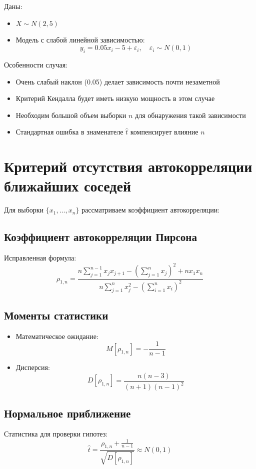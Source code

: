 \documentclass{article}
\begin{document}
Даны:
\begin{itemize}
    \item $X \sim N(2, 5)$
    \item Модель с слабой линейной зависимостью:
    \[ y_i = 0.05x_i - 5 + \varepsilon_i, \quad \varepsilon_i \sim N(0, 1)
    \]
\end{itemize}

Особенности случая:
\begin{itemize}
    \item Очень слабый наклон (0.05) делает зависимость почти незаметной
    \item Критерий Кендалла будет иметь низкую мощность в этом случае
    \item Необходим большой объем выборки $n$ для обнаружения такой зависимости
    \item Стандартная ошибка в знаменателе $\hat{t}$ компенсирует влияние $n$
\end{itemize}
\section{Критерий отсутствия автокорреляции ближайших соседей}

Для выборки $\{x_1, \dots, x_n\}$ рассматриваем коэффициент автокорреляции:

\subsection{Коэффициент автокорреляции Пирсона}
Исправленная формула:
\[
\rho_{1,n} = \frac{n\sum_{j=1}^{n-1}x_jx_{j+1} - \left(\sum_{j=1}^n x_j\right)^2 + nx_1x_n}{n\sum_{j=1}^n x_j^2 - \left(\sum_{i=1}^n x_i\right)^2}
\]

\subsection{Моменты статистики}
\begin{itemize}
    \item Математическое ожидание:
    \[ M[\rho_{1,n}] = -\frac{1}{n-1} \]
    
    \item Дисперсия:
    \[ D[\rho_{1,n}] = \frac{n(n-3)}{(n+1)(n-1)^2} \]
\end{itemize}

\subsection{Нормальное приближение}
Статистика для проверки гипотез:
\[
\hat{t} = \frac{\rho_{1,n} + \frac{1}{n-1}}{\sqrt{D[\rho_{1,n}]}} \approx N(0,1)
\]
\end{document}
